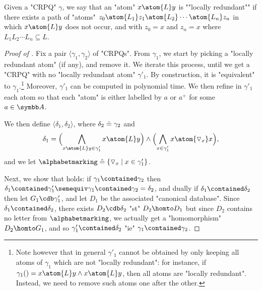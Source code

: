 Given a "CRPQ" $\gamma$, we say that an "atom" $x\atom{L} y$ is \AP""locally redundant"" if
there exists a path of "atoms" $z_0 \atom{L_1} z_1 \atom{L_2} \cdots \atom{L_n} z_n$
in which $x\atom{L} y$ does not occur, and with $z_0 = x$ and $z_n = x$
where $L_1 L_2\cdots L_n \subseteq L$.

\begin{proof}[Proof of ]
	Fix a pair $\langle \gamma_1, \gamma_2 \rangle$ of "CRPQs".
	From $\gamma_1$, we start by picking a "locally redundant atom" (if any), and remove it.
	We iterate this process, until we get a "CRPQ" with no "locally redundant atom" $\gamma'_1$.
	By construction, it is "equivalent" to $\gamma_1$.\footnote{Note however that in general $\gamma'_1$ cannot be
	obtained by only keeping all atoms of $\gamma_1$ which are not "locally redundant": for instance, if $\gamma_1() =
	x \atom{L} y \land x \atom{L} y$, then all atoms are "locally redundant".
	Instead, we need to remove such atoms one after the other.}
	Moreover, $\gamma'_1$ can be computed in polynomial time.
	We then refine in $\gamma'_1$ each atom so that each "atom" is either labelled by $a$ or
	$a^+$ for some $a\in \A$.

	We then define $\langle \delta_1, \delta_2 \rangle$, where
	$\delta_2 \mathrel{\hat{=}} \gamma_2$ and
	\[
		\delta_1 = \Bigl(
			\bigwedge_{x \atom{L} y \in \gamma'_1} x \atom{L} y
		\Bigr)
		\land 
		\Bigl(
			\bigwedge_{x \in \gamma'_1} x \atom{\marking_x} x
		\Bigr),
	\]
	and we let $\alphabetmarking \defeq \{\marking_x \mid x \in \gamma'_1\}$.

	Next, we show that \axiomCanonMonotonicity{} holds:
	if $\gamma_1 \contained \gamma_2$ then $\delta_1 \contained \gamma'_1 \semequiv \gamma_1 \contained \gamma_2 = \delta_2$,
	and dually if $\delta_1 \contained \delta_2$ then let $G_1 \cdb \gamma'_1$, and let $D_1$ be the associated "canonical database".
	Since $\delta_1 \contained \delta_2$, there exists $D_2 \cdb \delta_2$ "st" $D_2 \homto D_1$ but since $D_2$ contains no
	letter from $\alphabetmarking$, we actually get a "homomorphism" $D_2 \homto G_1$, and so $\gamma'_1 \contained \delta_2$
	"ie" $\gamma_1 \contained \gamma_2$.


\end{proof}
